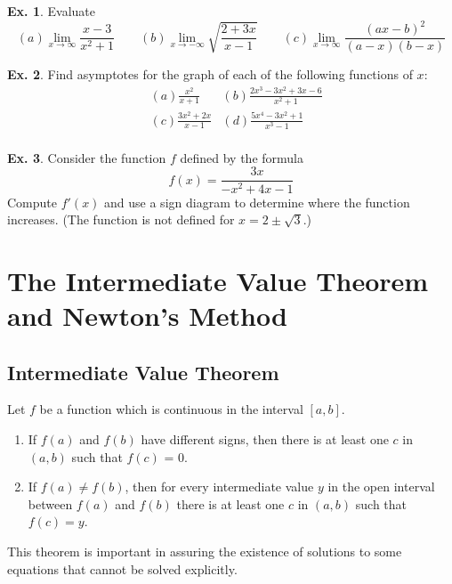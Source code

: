 \documentclass[10pt,a4paper]{book}
\theoremstyle{definition}\newtheorem{definition}{Definition}
\theoremstyle{definition}\newtheorem{fact}{Fact}
\theoremstyle{definition}\newtheorem{ex}{Ex.}
\theoremstyle{definition}\newtheorem{project}{Project}
\theoremstyle{definition}\newtheorem{problem}{Problem}
\theoremstyle{definition}\newtheorem{example}{Example}
\numberwithin{theorem}{chapter}
\numberwithin{corollary}{chapter}
\numberwithin{assumption}{chapter}
\numberwithin{definition}{chapter}
\numberwithin{prop}{chapter}
\numberwithin{notation}{chapter}
\numberwithin{problem}{chapter}
\numberwithin{example}{chapter}
\numberwithin{fact}{chapter}
\numberwithin{ex}{chapter}
\begin{document}
	\begin{ex}
		Evaluate
		\begin{equation*}
			(a) \lim_{x\rightarrow \infty} \frac{x-3}{x^2+1} \qquad
			(b) \lim_{x \rightarrow -\infty} \sqrt{\frac{2+3x}{x-1}} \qquad
			(c) \lim_{x \rightarrow \infty} \frac{(ax-b)^2}{(a-x)(b-x)}
		\end{equation*}
	\end{ex}
	
	\begin{ex}
		Find asymptotes for the graph of each of the following functions of $x$:
		\begin{align*}
			& (a) \frac{x^2}{x+1}              
			& (b) \frac{2x^3-3x^2+3x-6}{x^2+1} \\
			& (c) \frac{3x^2+2x}{x-1}          
			& (d) \frac{5x^4-3x^2+1}{x^3-1}    \\
		\end{align*}
	\end{ex}
	
	\begin{ex}
		Consider the function $f$ defined by the formula
		$$f(x) = \frac{3x}{-x^2+4x-1}$$
		Compute $f'(x)$ and use a sign diagram to determine where the function increases. (The function is not defined for $x=2\pm \sqrt{3}$.)
	\end{ex}
	
	\section{The Intermediate Value Theorem and Newton’s Method}
	
	\subsection{Intermediate Value Theorem}
	
	Let $f$ be a function which is continuous in the interval $[a, b]$.
	\begin{enumerate}[label=(\roman*)]
		\item If $f (a)$ and $f (b)$ have different signs, then there is at least one $c$ in $(a, b)$ such that $f (c)$ = 0.
		\item If $f (a) \neq f (b)$, then for every intermediate value $y$ in the open interval between $f(a)$ and $f(b)$ there is at least one $c$ in $(a,b)$ such that $f(c) = y$.
	\end{enumerate}
	
	This theorem is important in assuring the existence of solutions to some equations that cannot be solved explicitly.
	
\end{document}

